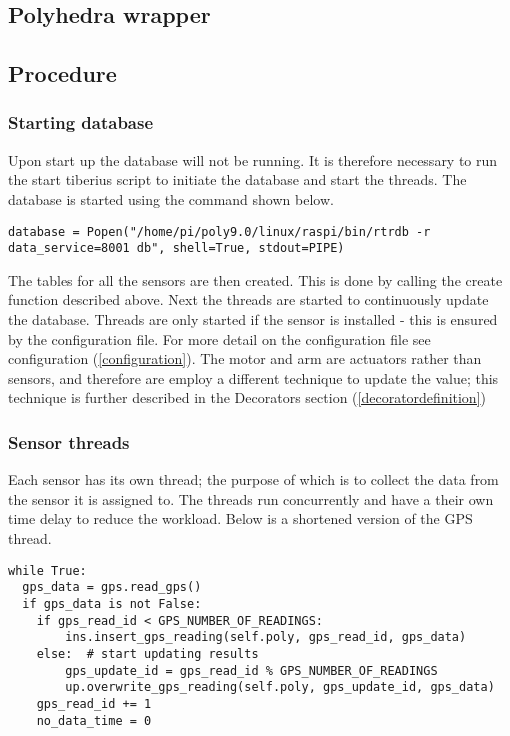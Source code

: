 \subsection{Polyhedra wrapper}





\subsection{Procedure}
\subsubsection{Starting database}
Upon start up the database will not be running. It is therefore necessary to run the start tiberius script to initiate the database and start the threads. The database is started using the command shown below.

\begin{lstlisting}[style=custompython]
database = Popen("/home/pi/poly9.0/linux/raspi/bin/rtrdb -r data_service=8001 db", shell=True, stdout=PIPE)
\end{lstlisting}

The tables for all the sensors are then created. This is done by calling the create function described above. Next the threads are started to continuously update the database. Threads are only started if the sensor is installed - this is ensured by the configuration file. For more detail on the configuration file see configuration  (\ref{configuration}). The motor and arm are actuators rather than sensors, and therefore are employ a different technique to update the value; this technique is further described in the Decorators section (\ref{decoratordefinition})

\subsubsection{Sensor threads}
Each sensor has its own thread; the purpose of which is to collect the data from the sensor it is assigned to. The threads run concurrently and have a their own time delay to reduce the workload.
Below is a shortened version of the GPS thread.
\begin{lstlisting}[style=custompython]
while True:
  gps_data = gps.read_gps()
  if gps_data is not False:
    if gps_read_id < GPS_NUMBER_OF_READINGS:
   		ins.insert_gps_reading(self.poly, gps_read_id, gps_data)
    else:  # start updating results
   		gps_update_id = gps_read_id % GPS_NUMBER_OF_READINGS
    	up.overwrite_gps_reading(self.poly, gps_update_id, gps_data)
    gps_read_id += 1
    no_data_time = 0
\end{lstlisting}

